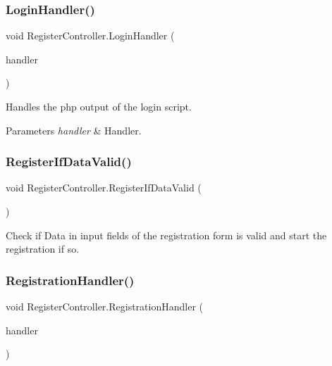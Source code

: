 \subsubsection{\texorpdfstring{Login\+Handler()}{LoginHandler()}}
{\footnotesize\ttfamily void Register\+Controller.\+Login\+Handler (\begin{DoxyParamCaption}\item[{\hyperlink{classPhpOutputHandler}{Php\+Output\+Handler}}]{handler }\end{DoxyParamCaption})\hspace{0.3cm}{\ttfamily [inline]}}



Handles the php output of the login script. 


\begin{DoxyParams}{Parameters}
{\em handler} & Handler.\\
\hline
\end{DoxyParams}
\mbox{\label{classRegisterController_a27e92b0ef5a5ba595f3b6c1a51a0c0d0}} 
\subsubsection{\texorpdfstring{Register\+If\+Data\+Valid()}{RegisterIfDataValid()}}
{\footnotesize\ttfamily void Register\+Controller.\+Register\+If\+Data\+Valid (\begin{DoxyParamCaption}{ }\end{DoxyParamCaption})\hspace{0.3cm}{\ttfamily [inline]}}



Check if Data in input fields of the registration form is valid and start the registration if so. 

\mbox{\label{classRegisterController_ac6582ef5a1dfcfedb2d84d6f31ba6f31}} 
\subsubsection{\texorpdfstring{Registration\+Handler()}{RegistrationHandler()}}
{\footnotesize\ttfamily void Register\+Controller.\+Registration\+Handler (\begin{DoxyParamCaption}\item[{\hyperlink{classPhpOutputHandler}{Php\+Output\+Handler}}]{handler }\end{DoxyParamCaption})\hspace{0.3cm}{\ttfamily [inline]}}



